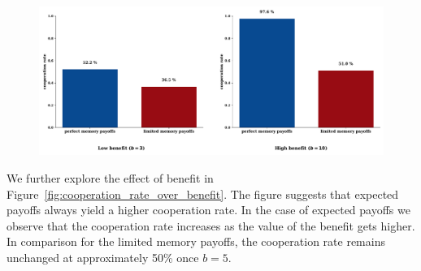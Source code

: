 \documentclass[11pt]{article}
\theoremstyle{plainCl1}
\theoremstyle{plainCl2}
\begin{document}
\begin{figure}[!htbp]
  \centering
  \includegraphics[width=.9\textwidth]{static/cooperation_rates_expected_and_stochastic_for_donation_game.pdf}
\end{figure}

We further explore the effect of benefit in
Figure~\ref{fig:cooperation_rate_over_benefit}. The figure suggests that
expected payoffs always yield a higher cooperation rate. In the case of expected
payoffs we observe that the cooperation rate increases as the value of the
benefit gets higher. In comparison for the limited memory payoffs, the
cooperation rate remains unchanged at approximately 50\% once \(b=5\).
\end{document}
